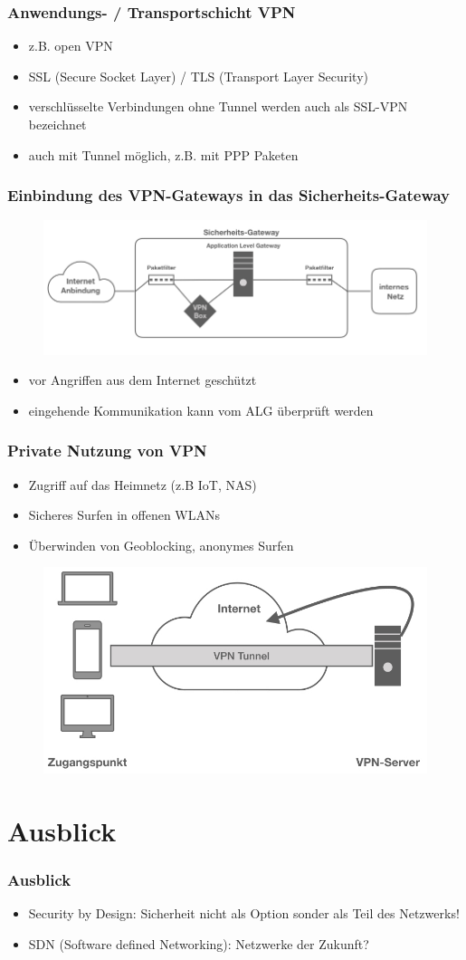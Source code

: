 \documentclass[hyperref={pdfpagelabels=false},xcolor=dvipsnames]{beamer}
\newcommand*\mi{ \item[\color{gray}\scalebox{1.2}{\textbullet}]}
\begin{document}
\begin{frame}
	\frametitle{Anwendungs- / Transportschicht VPN}
	\begin{itemize}
		\mi z.B. open VPN
		\mi SSL (Secure Socket Layer) / TLS (Transport Layer Security)
		\mi	verschlüsselte Verbindungen ohne Tunnel werden auch als SSL-VPN bezeichnet
		\mi auch mit Tunnel möglich, z.B. mit PPP Paketen
	\end{itemize}

		 
\end{frame}

\begin{frame}
	\frametitle{Einbindung des VPN-Gateways in das Sicherheits-Gateway}
	\begin{figure}
		\includegraphics[width=\textwidth]{vpnarchitektur.jpeg}	
	\end{figure}	
	\begin{itemize}
		\mi vor Angriffen aus dem Internet geschützt
		\mi eingehende Kommunikation kann vom ALG überprüft werden	
	\end{itemize}

	
\end{frame}
\begin{frame}
	\frametitle{Private Nutzung von VPN}
	\begin{itemize}
		\mi Zugriff auf das Heimnetz (z.B IoT, NAS)
		\mi Sicheres Surfen in offenen WLANs
		\mi Überwinden von Geoblocking, anonymes Surfen	
	\end{itemize}

	\begin{figure}
		\includegraphics[width=.9\textwidth]{vpnPrivat.001.jpeg}	
	\end{figure}

		 
\end{frame}

\section{Ausblick}

\begin{frame}
	\frametitle{Ausblick}
	\begin{itemize}
		\mi Security by Design: Sicherheit nicht als Option sonder als Teil des Netzwerks!
		\mi SDN (Software defined Networking): Netzwerke der Zukunft?
		
	\end{itemize}	
\end{frame}
\end{document}
